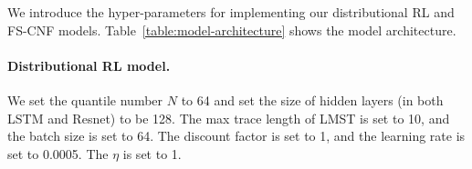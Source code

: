 \documentclass{article}
\begin{document}
\begin{table}[htbp]
\end{table}

We introduce the hyper-parameters for implementing our distributional RL and FS-CNF models. Table~\ref{table:model-architecture} shows the model architecture.

\paragraph{Distributional RL model.} We set the quantile number $N$ to 64 and set the size of hidden layers (in both LSTM and Resnet) to be 128. The max trace length of LMST is set to 10, and the batch size is set to 64. The discount factor is set to 1, and the learning rate is set to 0.0005. The $\eta$ is set to 1.
\end{document}
